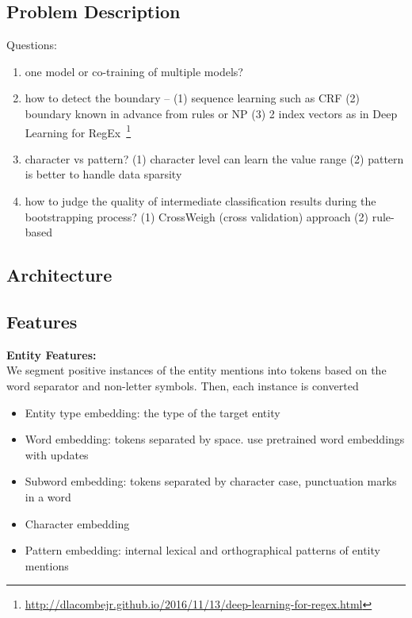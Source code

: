 \subsection{Problem Description}

Questions:
\begin{enumerate}
\item{one model or co-training of multiple models?}
\item{how to detect the boundary -- (1) sequence learning such as CRF (2) boundary known in advance from rules or NP (3) 2 index vectors as in Deep Learning for RegEx~\footnote{\url{http://dlacombejr.github.io/2016/11/13/deep-learning-for-regex.html}}}
\item{character vs pattern? (1) character level can learn the value range (2) pattern is better to handle data sparsity}
\item{how to judge the quality of intermediate classification results during the bootstrapping process? (1) CrossWeigh (cross validation) approach (2) rule-based}

\end{enumerate}

\subsection{Architecture}



\subsection{Features}
\textbf{Entity Features:}\\
We segment positive instances of the entity mentions into tokens based on the word separator and non-letter symbols.
Then, each instance is converted

\begin{itemize}
\item{Entity type embedding: the type of the target entity}
\item{Word embedding: tokens separated by space.  use pretrained word embeddings with updates}
\item{Subword embedding: tokens separated by character case, punctuation marks in a word}
\item{Character embedding}
\item{Pattern embedding: internal lexical and orthographical patterns of entity mentions}
\end{itemize}

